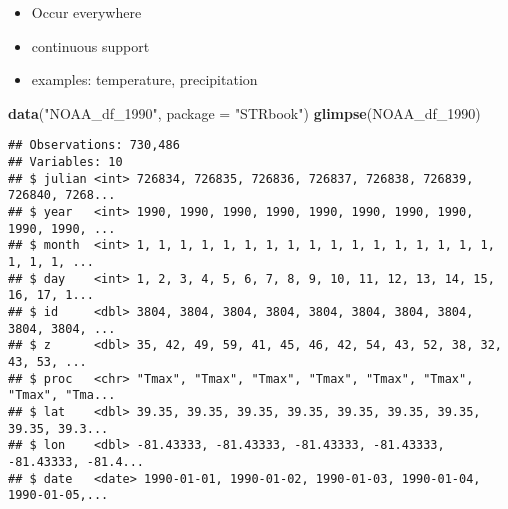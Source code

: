 \documentclass[]{book}
\newenvironment{Shaded}{\begin{snugshade}}{\end{snugshade}}
\newcommand{\DataTypeTok}[1]{\textcolor[rgb]{0.13,0.29,0.53}{#1}}
\newcommand{\DecValTok}[1]{\textcolor[rgb]{0.00,0.00,0.81}{#1}}
\newcommand{\KeywordTok}[1]{\textcolor[rgb]{0.13,0.29,0.53}{\textbf{#1}}}
\newcommand{\NormalTok}[1]{#1}
\newcommand{\StringTok}[1]{\textcolor[rgb]{0.31,0.60,0.02}{#1}}
\providecommand{\tightlist}{%
  \setlength{\itemsep}{0pt}\setlength{\parskip}{0pt}}
\begin{document}
\begin{itemize}
\tightlist
\item
  Occur everywhere
\item
  continuous support
\item
  examples: temperature, precipitation
\end{itemize}

\begin{Shaded}
\begin{Highlighting}[]
\KeywordTok{data}\NormalTok{(}\StringTok{"NOAA_df_1990"}\NormalTok{, }\DataTypeTok{package =} \StringTok{"STRbook"}\NormalTok{)}
\KeywordTok{glimpse}\NormalTok{(NOAA_df_}\DecValTok{1990}\NormalTok{)}
\end{Highlighting}
\end{Shaded}

\begin{verbatim}
## Observations: 730,486
## Variables: 10
## $ julian <int> 726834, 726835, 726836, 726837, 726838, 726839, 726840, 7268...
## $ year   <int> 1990, 1990, 1990, 1990, 1990, 1990, 1990, 1990, 1990, 1990, ...
## $ month  <int> 1, 1, 1, 1, 1, 1, 1, 1, 1, 1, 1, 1, 1, 1, 1, 1, 1, 1, 1, 1, ...
## $ day    <int> 1, 2, 3, 4, 5, 6, 7, 8, 9, 10, 11, 12, 13, 14, 15, 16, 17, 1...
## $ id     <dbl> 3804, 3804, 3804, 3804, 3804, 3804, 3804, 3804, 3804, 3804, ...
## $ z      <dbl> 35, 42, 49, 59, 41, 45, 46, 42, 54, 43, 52, 38, 32, 43, 53, ...
## $ proc   <chr> "Tmax", "Tmax", "Tmax", "Tmax", "Tmax", "Tmax", "Tmax", "Tma...
## $ lat    <dbl> 39.35, 39.35, 39.35, 39.35, 39.35, 39.35, 39.35, 39.35, 39.3...
## $ lon    <dbl> -81.43333, -81.43333, -81.43333, -81.43333, -81.43333, -81.4...
## $ date   <date> 1990-01-01, 1990-01-02, 1990-01-03, 1990-01-04, 1990-01-05,...
\end{verbatim}
\end{document}
